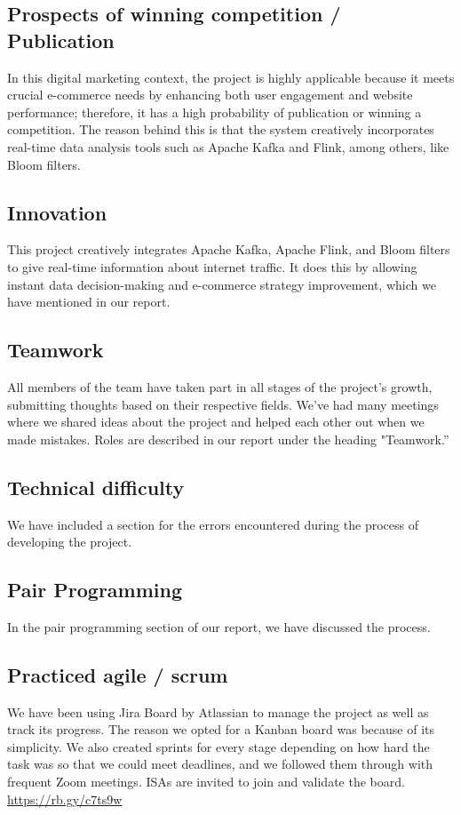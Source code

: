 \documentclass[conference]{IEEEtran}
\begin{document}
\subsection{Prospects of winning competition / Publication}
In this digital marketing context, the project is highly applicable because it meets crucial e-commerce needs by enhancing both user engagement and website performance; therefore, it has a high probability of publication or winning a competition. The reason behind this is that the system creatively incorporates real-time data analysis tools such as Apache Kafka and Flink, among others, like Bloom filters.
\subsection{Innovation}
This project creatively integrates Apache Kafka, Apache Flink, and Bloom filters to give real-time information about internet traffic. It does this by allowing instant data decision-making and e-commerce strategy improvement, which we have mentioned in our report.
\subsection{Teamwork}
All members of the team have taken part in all stages of the project’s growth, submitting thoughts based on their respective fields. We’ve had many meetings where we shared ideas about the project and helped each other out when we made mistakes. Roles are described in our report under the heading "Teamwork.”
\subsection{Technical difficulty}
We have included a section for the errors encountered during the process of developing the project.
\subsection{Pair Programming}
In the pair programming section of our report, we have discussed the process.
\subsection{Practiced agile / scrum}
We have been using Jira Board by Atlassian to manage the project as well as track its progress. The reason we opted for a Kanban board was because of its simplicity. We also created sprints for every stage depending on how hard the task was so that we could meet deadlines, and we followed them through with frequent Zoom meetings. ISAs are invited to join and validate the board.\\
\url{https://rb.gy/c7ts9w}
\end{document}
